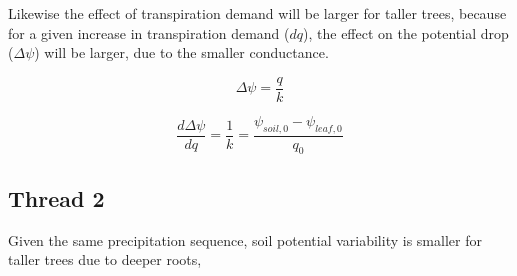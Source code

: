 \documentclass[11pt]{article}
\begin{document}
Likewise the effect of transpiration demand will be larger for taller trees, because for a given increase in transpiration demand ($dq$),
the effect on the potential drop ($\Delta\psi$) will be larger, due to the smaller conductance.

\begin{equation}
\Delta\psi = \dfrac{q}{k}
\end{equation}

\begin{equation}
\dfrac{d\Delta\psi}{dq} = \dfrac{1}{k} = \dfrac{\psi_{soil,0}-\psi_{leaf,0}}{q_0}
\end{equation}



\subsection{Thread 2}
Given the same precipitation sequence, soil potential variability is smaller for taller trees due to deeper roots, 
\end{document}
